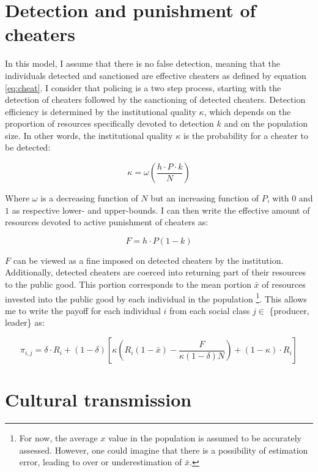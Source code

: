 \documentclass[a4paper]{article}
\begin{document}
\section{Detection and punishment of cheaters}
\label{sec:cheat}

In this model, I assume that there is no false detection, meaning that the individuals detected and sanctioned are effective cheaters as defined by equation \ref{eq:cheat}. I consider that policing is a two step process, starting with the detection of cheaters followed by the sanctioning of detected cheaters. Detection efficiency is determined by the institutional quality $\kappa$, which depends on the proportion of resources specifically devoted to detection $k$ and on the population size. In other words, the institutional quality $\kappa$ is the probability for a cheater to be detected:

\begin{equation}
\kappa=\omega\left(\frac{h\cdot P\cdot k}{N}\right)
\end{equation} 

Where $\omega$ is a decreasing function of $N$ but an increasing function of $P$, with $0$ and $1$ as respective lower- and upper-bounds. I can then write the effective amount of resources devoted to active punishment of cheaters as:

\begin{equation}
F=h\cdot P\left(1-k\right)
\end{equation}

$F$ can be viewed as a fine imposed on detected cheaters by the institution. Additionally, detected cheaters are coerced into returning part of their resources to the public good. This portion corresponds to the mean portion $\bar{x}$ of resources invested into the public good by each individual in the population \footnote{For now, the average $x$ value in the population is assumed to be accurately assessed. However, one could imagine that there is a possibility of estimation error, leading to over or underestimation of $\bar{x}$.}. This allows me to write the payoff for each individual $i$ from each social class $j\in$ \{producer, leader\} as:

\begin{equation}
\pi_{i,j}=\delta\cdot R_i+\left(1-\delta\right)\left[\kappa\left(R_i\left(1-\bar{x}\right)-\frac{F}{\kappa\left(1-\delta\right)N}\right)+\left(1-\kappa\right)\cdot R_i\right] 
\end{equation}

\section{Cultural transmission}
\label{sec:trans}
\end{document}
